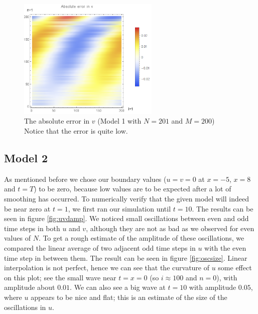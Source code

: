 \documentclass{article}
\renewcommand{\(}{\left(}
\renewcommand{\)}{\right)}
\begin{document}
\begin{figure}
\centering
\includegraphics[width=0.6\textwidth]{errorVneat201x200.png}
\caption{The absolute error in $v$ (Model 1 with $N=201$ and $M=200$)\\Notice that the error is quite low.}
\label{fig:verr1big}
\end{figure}

\clearpage

\subsection*{Model 2}
As mentioned before we chose our boundary values ($u = v = 0$ at $x = -5$, $x = 8$ and $t = T$) to be zero, because low values are to be expected after a lot of smoothing has occurred. To numerically verify that the given model will indeed be near zero at $t=1$, we first ran our simulation until $t=10$. The results can be seen in figure \ref{fig:uvdamp}. We noticed small oscillations between even and odd time steps in both $u$ and $v$, although they are not as bad as we observed for even values of $N$. To get a rough estimate of the amplitude of these oscillations, we compared the linear average of two adjacent odd time steps in $u$ with the even time step in between them. The result can be seen in figure \ref{fig:oscsize}. Linear interpolation is not perfect, hence we can see that the curvature of $u$ some effect on this plot; see the small wave near $t=x=0$ (so $i \approx 100$ and $n = 0$), with amplitude about $0.01$. We can also see a big wave at $t=10$ with amplitude $0.05$, where $u$ appears to be nice and flat; this is an estimate of the size of the oscillations in $u$.
\end{document}
